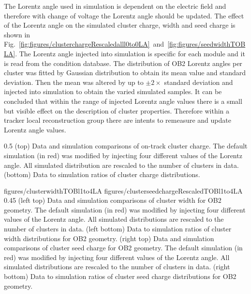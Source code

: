The Lorentz angle used in simulation is dependent on the electric field and therefore with change of voltage the Lorentz angle should be updated. The effect of the Lorentz angle on the simulated cluster charge, width and seed charge is shown in Fig.~\ref{fig:figures/clusterchargeRescaledalll0to0LA}~and~\ref{fig:figures/seedwidthTOBLA}. The Lorentz angle injected into simulation is specific for each module and it is read from the condition database. The distribution of OB2 Lorentz angles per cluster was fitted by Gaussian distribution to obtain its mean value and standard deviation. Then the mean was altered by up to $\pm 2 \times$ standard deviation and injected into simulation to obtain the varied simulated samples. It can be concluded that within the range of injected Lorentz angle values there is a small but visible effect on the description of cluster properties. Therefore within a tracker local reconstruction group there are intents to remeasure and update Lorentz angle values.


                 {0.5}       %
                 { (top) Data and simulation comparisons of on-track cluster charge. The default simulation (in red) was modified by injecting four different values of the Lorentz angle. All simulated distribution are rescaled to the number of clusters in data. (bottom) Data to simulation ratios of cluster charge distributions. }

                 {figures/clusterwidthTOBl1to4LA}
                 {figures/clusterseedchargeRescaledTOBl1to4LA} %
                 {0.45}       %
                 {(left top) Data and simulation  comparisons of cluster width for OB2 geometry. The default simulation (in red) was modified by injecting four different values of the Lorentz angle. All simulated distributions are rescaled to the number of clusters in data. (left bottom) Data to simulation ratios of cluster width distributions for OB2 geometry. (right top) Data and simulation  comparisons of cluster seed charge for OB2 geometry. The default simulation (in red) was modified by injecting four different values of the Lorentz angle. All simulated distributions are rescaled to the number of clusters in data. (right bottom) Data to simulation ratios of cluster seed charge distributions for OB2 geometry. }

